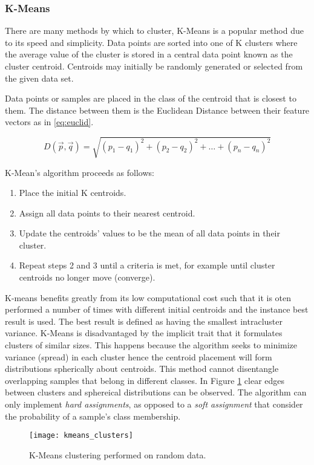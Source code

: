 \subsubsection{K-Means}
There are many methods by which to cluster, K-Means is a popular method due to its speed and simplicity. Data points are sorted into one of K clusters where the average value of the cluster is stored in a central data point known as the cluster centroid. Centroids may initially be randomly generated or selected from the given data set. 

Data points or samples are placed in the class of the centroid that is closest to them. The distance between them is the Euclidean Distance between their feature vectors as in \ref{eq:euclid}. 

\begin{equation}
    D(\vec{p},\vec{q}) = \sqrt{(p_1 - q_1)^2 + (p_2 - q_2)^2 +\hdots + (p_n - q_n)^2}
    \label{eq:euclid}
\end{equation} 

K-Mean's algorithm proceeds as follows:
    \begin{enumerate}
    \itemsep0em
        \item Place the initial K centroids.
        \item Assign all data points to their nearest centroid.
        \item Update the centroids' values to be the mean of all data points in their cluster.
        \item Repeat steps 2 and 3 until a criteria is met, for example until cluster centroids no longer move (converge).
    \end{enumerate}

K-means benefits greatly from its low computational cost such that it is oten performed a number of times with different initial centroids and the instance best result is used. The best result is defined as having the smallest intracluster variance. K-Means is disadvantaged by the implicit trait that it formulates clusters of similar sizes. This happens because the algorithm seeks to minimize variance (spread) in each cluster hence the  centroid placement will form distributions spherically about centroids. This method cannot disentangle overlapping samples that belong in different classes. In Figure \ref{fig:clusters} clear edges between clusters and sphereical distributions can be observed. The algorithm can only implement \emph{hard assignments}, as opposed to a \emph{soft assignment} that consider the probability of a sample's class membership. 



\begin{figure}[H]
    \centering
    \centering\texttt{[image: kmeans\_clusters]}
    \caption{K-Means clustering performed on random data.}
    \label{fig:clusters}
\end{figure} 